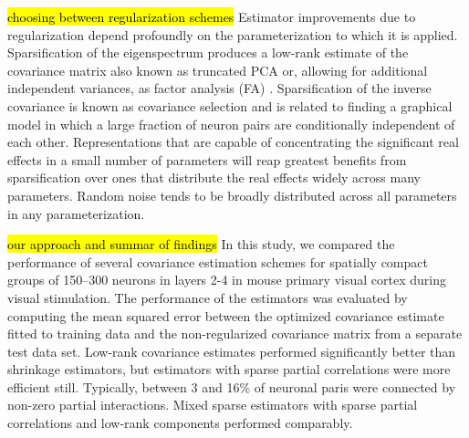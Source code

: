 \hl{\tiny choosing between regularization schemes}
Estimator improvements due to regularization depend profoundly on the parameterization to which it is applied.  
Sparsification  of the eigenspectrum produces a low-rank estimate of the covariance matrix also known as truncated PCA \citep{Rothman:2008}  or, allowing for additional independent variances, as factor analysis (FA) \citep{Fan:2008}.   Sparsification of the inverse covariance is known as covariance selection \citep{Dempster:1972,Friedman:2008} and is related to finding a graphical model in which a large fraction of neuron pairs are conditionally independent of each other.  Representations that are capable of concentrating the significant real effects in a small number of parameters will reap greatest benefits from sparsification over ones that distribute the real effects widely across many parameters.  Random noise tends to be broadly distributed across all parameters in any parameterization. 


\hl{\tiny our approach and summar of findings} 
In this study, we compared the performance of several covariance estimation schemes for spatially compact  groups of 150--300 neurons in layers 2-4 in mouse primary visual cortex during visual stimulation.   The performance of the estimators was evaluated by computing the mean squared error between the optimized covariance estimate fitted to training data and the non-regularized covariance matrix from a separate test data set.  Low-rank covariance estimates performed significantly better than shrinkage estimators, but estimators with sparse partial correlations were more efficient still. Typically, between 3 and 16\% of neuronal paris were connected by non-zero partial interactions.  Mixed sparse estimators with sparse partial correlations and low-rank components performed comparably. 


